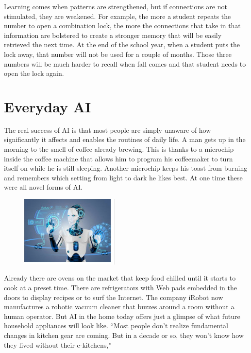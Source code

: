 \documentclass[12pt]{article}
\begin{document}
 Learning comes when patterns are strengthened, but if connections are not stimulated, they are weakened. For example, the more a student repeats the number to open a combination lock, the more the connections that take in that information are bolstered to create a stronger memory that will be easily retrieved the next time. At the end of the school year, when a student puts the lock away, that number will not be used for a couple of months. Those three numbers will be much harder to recall when fall comes and that student needs to open the lock again. \\
\newpage
\Huge
\section{\textbf{Everyday AI }}
\center
\large\flushleft
The real success of AI is that most people are simply unaware of how significantly it affects and enables the routines of daily life. A man gets up in the morning to the smell of coffee already brewing. This is thanks to a microchip inside the coffee machine that allows him to program his coffeemaker to turn itself on while he is still sleeping. Another microchip keeps his toast from burning and remembers which setting from light to dark he likes best. At one time these were all novel forms of AI.  \\
\begin{figure}[h]
\center
  \includegraphics[width=5cm]{Image/IMG_20200125_232725.jpg}
  \caption{}
 \end{figure}
Already there are ovens on the market that keep food chilled until it starts to cook at a preset time. There are refrigerators with Web pads embedded in the doors to display recipes or to surf the Internet. The company iRobot now manufactures a robotic vacuum cleaner that buzzes around a room without a human operator. But AI in the home today offers just a glimpse of what future household appliances will look like. “Most people don’t realize fundamental changes in kitchen gear are coming. But in a decade or so, they won’t know how they lived without their e-kitchens,” \\
\huge
\end{document}
